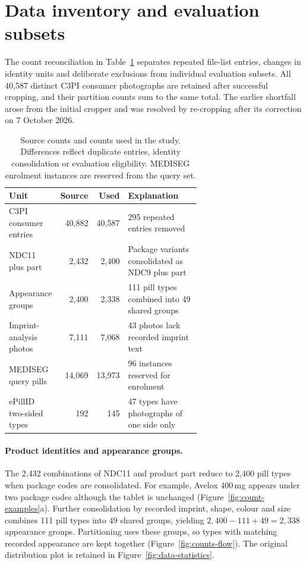 \section{Data inventory and evaluation subsets}
\label{app:data}
The count reconciliation in Table~\ref{tab:data-counts} separates repeated file-list entries, changes in identity units and deliberate exclusions from individual evaluation subsets. All 40,587 distinct C3PI consumer photographs are retained after successful cropping, and their partition counts sum to the same total. The earlier shortfall arose from the initial cropper and was resolved by re-cropping after its correction on 7 October 2026.

\begin{table}[!htbp]
\centering\small
\caption{Source counts and counts used in the study. Differences reflect duplicate entries, identity consolidation or evaluation eligibility. MEDISEG enrolment instances are reserved from the query set.}
\label{tab:data-counts}
\begin{tabular}{@{}p{0.25\linewidth}rrp{0.39\linewidth}@{}}
\toprule
Unit & Source & Used & Explanation \\
\midrule
C3PI consumer entries & 40,882 & 40,587 & 295 repeated entries removed \\
NDC11 plus part & 2,432 & 2,400 & Package variants consolidated as NDC9 plus part \\
Appearance groups & 2,400 & 2,338 & 111 pill types combined into 49 shared groups \\
Imprint-analysis photos & 7,111 & 7,068 & 43 photos lack recorded imprint text \\
MEDISEG query pills & 14,069 & 13,973 & 96 instances reserved for enrolment \\
ePillID two-sided types & 192 & 145 & 47 types have photographs of one side only \\
\bottomrule
\end{tabular}
\end{table}

\paragraph{Product identities and appearance groups.} The 2,432 combinations of NDC11 and product part reduce to 2,400 pill types when package codes are consolidated. For example, Avelox 400\,mg appears under two package codes although the tablet is unchanged (Figure~\ref{fig:count-examples}a). Further consolidation by recorded imprint, shape, colour and size combines 111 pill types into 49 shared groups, yielding $2,400-111+49=2,338$ appearance groups. Partitioning uses these groups, so types with matching recorded appearance are kept together (Figure~\ref{fig:counts-flow}). The original distribution plot is retained in Figure~\ref{fig:data-statistics}.


